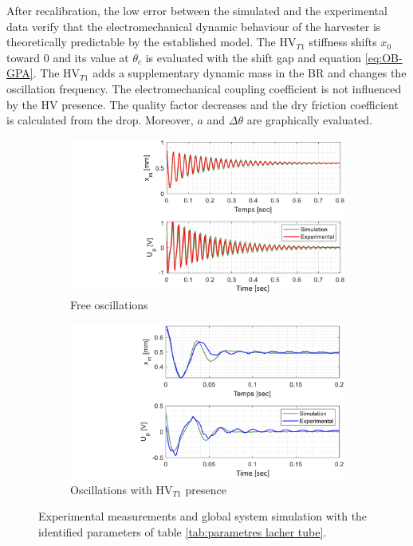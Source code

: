 \documentclass[3p,twocolumn,preprint]{elsarticle}
\begin{document}
After recalibration, the low error between the simulated and the experimental data verify that the electromechanical dynamic behaviour of the harvester is theoretically predictable by the established model. The HV$_{T1}$ stiffness shifts $x_0$ toward $0$ and its value at $\theta_c$ is evaluated with the shift gap and equation \ref{eq:OB-GPA}. The HV$_{T1}$ adds a supplementary dynamic mass in the BR and changes the oscillation frequency. The electromechanical coupling coefficient is not influenced by the HV presence. The quality factor decreases and the dry friction coefficient is calculated from the drop. Moreover, $a$ and $\Delta\theta$ are graphically evaluated.
\begin{figure}[!htbp]	
\captionsetup{justification=centering}
	\begin{subfigure}{.49\linewidth}
		\includegraphics[trim={9cm 0cm 0cm 0cm},clip,width=\linewidth]{figures/recalage_free.pdf}
		\caption{Free oscillations}
		\label{fig:recalage_free}
	\end{subfigure}
	\begin{subfigure}{.49\linewidth}
		\includegraphics[trim={8.6cm 0cm 0cm 0cm},clip,width=\linewidth]{figures/recalage_tube.pdf}
		\caption{Oscillations with HV$_{T1}$ presence}
		\label{fig:recalage_tube}
	\end{subfigure}
	\caption{Experimental measurements and global system simulation with the identified parameters of table \ref{tab:parametres lacher tube}.}
	\label{fig:recalage_global}
\end{figure}
\end{document}
